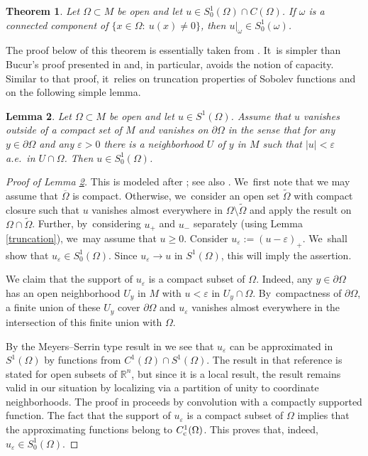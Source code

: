 \documentclass[JEP,XML,SOM,Unicode,published]{cedram}
\newcommand{\rc}{\textup{c}}
\newtheorem{theorem}{Theorem}[section]
\newtheorem{lemma}[theorem]{Lemma}
\theoremstyle{definition}
\let\epsilon\varepsilon
\newcommand{\1}{\mathbbm{1}}
\newcommand{\R}{\mathbb{R}}
\begin{document}
\begin{theorem}\label{restriction}
Let $\Omega\subset M$ be open and let $u\in S^1_0(\Omega)\cap C(\Omega)$. If $\omega$ is a connected component of $\{ x\in\Omega:\ u(x)\neq 0\}$, then $u|_\omega \in S^1_0(\omega)$.
\end{theorem}

The proof below of this theorem is essentially taken from \cite{MP}. It~is simpler than Bucur's proof presented in \cite{LMP} and, in particular, avoids the notion of capacity. Similar to that proof, it~relies on truncation properties of Sobolev functions and on the following simple lemma.

\begin{lemma}\label{s10easy}
Let $\Omega\subset M$ be open and let $u\in S^1(\Omega)$. Assume that $u$ vanishes outside of a compact set of $M$ and vanishes on $\partial\Omega$ in the sense that for any $y\in\partial\Omega$ and any $\epsilon>0$ there is a neighborhood $U$ of $y$ in $M$ such that $|u|<\epsilon$ a.e.\ in $U\cap\Omega$. Then $u\in S^1_0(\Omega)$.
\end{lemma}

\begin{proof}[Proof of Lemma \ref{s10easy}]
This is modeled after \cite[Lem.\,1.26]{HeKiMa}; see also \cite[Lem.\,1]{HeNoSw}. We~first note that we may assume that $\overline\Omega$ is compact. Otherwise, we~consider an open set $\widetilde \Omega$ with compact closure such that $u$ vanishes almost everywhere in $\Omega\setminus\widetilde \Omega$ and apply the result on $\Omega\cap\widetilde \Omega$. Further, by~considering $u_+$ and $u_-$ separately (using Lemma \ref{truncation}), we~may assume that $u\geq 0$. Consider $u_\epsilon:=(u-\epsilon)_+$. We~shall show that $u_\epsilon\in S^1_0(\Omega)$. Since $u_\epsilon\to u$ in $S^1(\Omega)$, this will imply the assertion.

We claim that the support of $u_\epsilon$ is a compact subset of $\Omega$. Indeed, any $y\in\partial\Omega$ has an open neighborhood $U_y$ in $M$ with $u<\epsilon$ in $U_y\cap\Omega$. By~compactness of $\partial\Omega$, a finite union of these $U_y$ cover $\partial\Omega$ and $u_\epsilon$ vanishes almost everywhere in the intersection of this finite union with $\Omega$.

By the Meyers--Serrin type result in \cite[Th.\,1.13]{GaNh} we see that $u_\epsilon$ can be approximated in $S^1(\Omega)$ by functions from $C^1(\Omega)\cap S^1(\Omega)$. The result in that reference is stated for open subsets of $\R^n$, but since it is a local result, the result remains valid in our situation by localizing via a partition of unity to coordinate neighborhoods. The proof in \cite{GaNh} proceeds by convolution with a compactly supported function. The fact that the support of $u_\epsilon$ is a compact subset of $\Omega$ implies that the approximating functions belong to $C^1_\rc(\Omega)$. This proves that, indeed, $u_\epsilon\in S^1_0(\Omega)$.
\end{proof}
\end{document}
